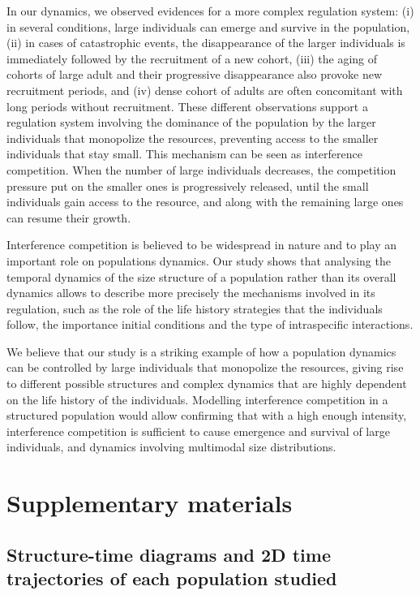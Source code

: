 In our dynamics, we observed evidences for a more complex regulation system: (i)
in several conditions, large individuals can emerge and survive in the
population, (ii) in cases of catastrophic events, the disappearance of the
larger individuals is immediately followed by the recruitment of a new cohort,
(iii) the aging of cohorts of large adult and their progressive disappearance
also provoke new recruitment periods, and (iv) dense cohort of adults are often
concomitant with long periods without recruitment. These different observations
support a regulation system involving the dominance of the population by the
larger individuals that monopolize the resources, preventing access to the
smaller individuals that stay small. This mechanism can be seen as interference
competition. When the number of large individuals decreases, the competition
pressure put on the smaller ones is progressively released, until the small
individuals gain access to the resource, and along with the remaining large ones
can resume their growth.

Interference competition is believed to be widespread in nature and to play an
important role on populations dynamics. Our study shows that analysing the
temporal dynamics of the size structure of a population rather than its overall
dynamics allows to describe more precisely the mechanisms involved in its
regulation, such as the role of the life history strategies that the individuals
follow, the importance initial conditions and the type of intraspecific
interactions.

We believe that our study is a striking example of how a population dynamics can
be controlled by large individuals that monopolize the resources, giving rise to
different possible structures and complex dynamics that are highly dependent on
the life history of the individuals. Modelling interference competition in a
structured population would allow confirming that with a high enough intensity,
interference competition is sufficient to cause emergence and survival of large
individuals, and dynamics involving multimodal size distributions.

\newpage
\section{Supplementary materials}

\subsection{Structure-time diagrams and 2D time trajectories of each population
studied}

